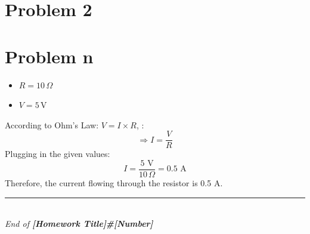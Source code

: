 \documentclass[12pt]{article}
\newcommand{\hwNumber}{\#[Number]}
\newcommand{\hwTitle}{[Homework Title]}
\begin{document}
\begin{tcolorbox}[colback=gray!10, colframe=black, title=Given]
\end{tcolorbox}

\begin{tcolorbox}[colback=yellow!20, colframe=black, title=Solution]
\end{tcolorbox}

\section*{Problem 2}

\begin{tcolorbox}[colback=gray!10, colframe=black, title=Given]
\end{tcolorbox}

\begin{tcolorbox}[colback=yellow!20, colframe=black, title=Solution]
\end{tcolorbox}



\section*{Problem n}

\begin{tcolorbox}[colback=gray!10, colframe=black, title=Given]
    \begin{itemize}
        \item \( R = 10 \, \Omega \)
        \item \( V = 5 \, \text{V} \)
    \end{itemize}
\end{tcolorbox}

\begin{tcolorbox}[colback=yellow!20, colframe=black, title=Solution]
    According to Ohm's Law: \( V = I \times R \), :
    \[ \Rightarrow I = \frac{V}{R} \]
    Plugging in the given values:
    \[ I = \frac{5 \text{ V}}{10 \, \Omega} = 0.5 \text{ A} \]
    Therefore, the current flowing through the resistor is 0.5 A.
\end{tcolorbox}


\vfill
\begin{center}
    \rule{0.5\linewidth}{0.5pt}\\
    \textit{End of \textbf{\hwTitle \space \hwNumber}}
\end{center}
\end{document}
